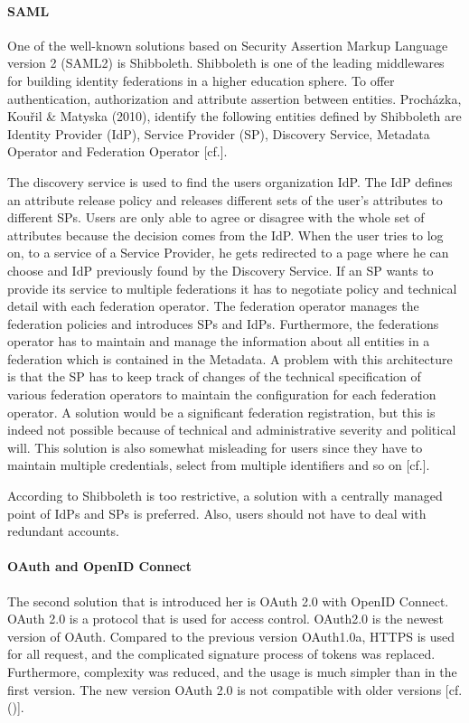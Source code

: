 {{		\paragraph{SAML}
		\label{SAML}
		One of the well-known solutions based on Security Assertion Markup Language version 2 (SAML2) is Shibboleth. Shibboleth is one of the leading middlewares for building identity federations in a higher education sphere. To offer authentication, authorization and attribute assertion between entities. Procházka, Kouřil \& Matyska (2010), identify the following entities defined by Shibboleth are Identity Provider (IdP), Service Provider (SP), Discovery Service, Metadata Operator and Federation Operator  [cf.\cite{Prochazka:2010:UCA}].
		
		The discovery service is used to find the users organization IdP. The IdP defines an attribute release policy and releases different sets of the user's attributes to different SPs. Users are only able to agree or disagree with the whole set of attributes because the decision comes from the IdP. When the user tries to log on, to a service of a Service Provider, he gets redirected to a page where he can choose and IdP previously found by the Discovery Service. If an SP wants to provide its service to multiple federations it has to negotiate policy and technical detail with each federation operator. The federation operator manages the federation policies and introduces SPs and IdPs.
		Furthermore, the federations operator has to maintain and manage the information about all entities in a federation which is contained in the Metadata. A problem with this architecture is that the SP has to keep track of changes of the technical specification of various federation operators to maintain the configuration for each federation operator. A solution would be a significant federation registration, but this is indeed not possible because of technical and administrative severity and political will. This solution is also somewhat misleading for users since they have to maintain multiple credentials, select from multiple identifiers and so on [cf.\cite{Prochazka:2010:UCA}].
		
		According to \cite{Prochazka:2010:UCA} Shibboleth is too restrictive, a solution with a centrally managed point of IdPs and SPs is preferred. Also, users should not have to deal with redundant accounts.		
		
		\paragraph{OAuth and OpenID Connect}
		\label{OAuthAndOpenID}
		The second solution that is introduced her is OAuth 2.0 with OpenID Connect.	OAuth 2.0 is a protocol that is used for access control. OAuth2.0 is the newest version of  OAuth. Compared to the previous version OAuth1.0a, HTTPS is used for all request, and the complicated signature process of tokens was replaced. Furthermore, complexity was reduced, and the usage is much simpler than in the first version. The new version OAuth 2.0 is not compatible with older versions [cf.  (\cite{LeBlanc:2011:SocialApplications})].
		
}}
